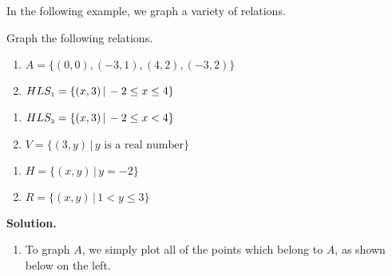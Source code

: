 In the following example, we graph a variety of relations.

\begin{ex}  Graph the following relations. \label{relationgraphingexample}

\begin{multicols}{2}
\begin{enumerate}

\item  $A = \{ (0,0), (-3,1), (4,2), (-3,2)\}$
\item  $HLS_{\mbox{\tiny$1$}} = \{ (x,3) \, | \, -2 \leq x \leq 4\}$

\setcounter{HW}{\value{enumi}}
\end{enumerate}
\end{multicols}

\begin{multicols}{2}
\begin{enumerate}
\setcounter{enumi}{\value{HW}}

\item  $HLS_{\mbox{\tiny$2$}} = \{ (x,3) \, | \, -2 \leq x < 4\}$ \label{opencircleintroduction}
\item  $V = \{ (3,y) \, | \, \mbox{$y$ is a real number} \}$

\setcounter{HW}{\value{enumi}}
\end{enumerate}
\end{multicols}

\enlargethispage{.25in}
\vspace{-.15in}

\begin{multicols}{2}
\begin{enumerate}
\setcounter{enumi}{\value{HW}}

\item  $H = \{ (x,y) \, | \, y = -2 \}$
\item  $R = \{ (x,y) \, | \, 1 < y \leq 3 \}$

\setcounter{HW}{\value{enumi}}
\end{enumerate}
\end{multicols}
\vspace{-.2in}

\pagebreak

{\bf Solution.}  

\begin{enumerate}

\item  To graph $A$, we simply plot all of the points which belong to $A$, as shown below on the left.


\end{enumerate}
\end{ex}
